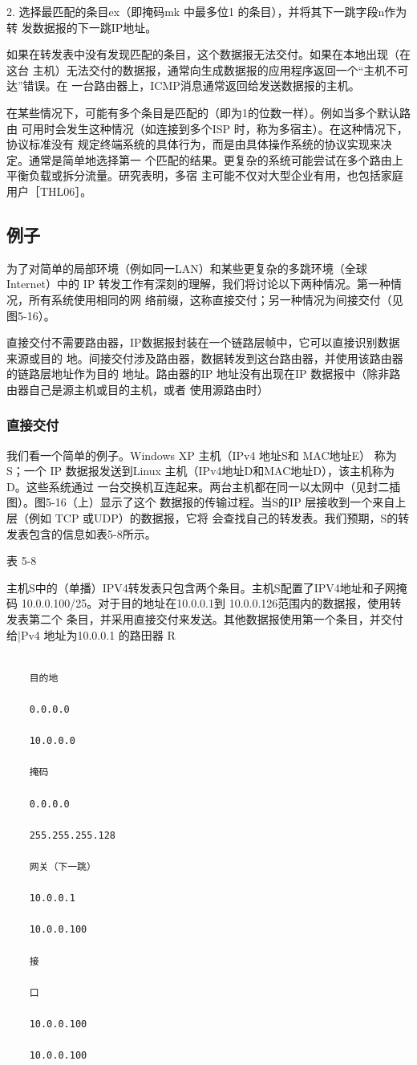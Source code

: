 2. 选择最匹配的条目ex（即掩码mk 中最多位1 的条目），并将其下一跳字段n作为转
发数据报的下一跳IP地址。

如果在转发表中没有发现匹配的条目，这个数据报无法交付。如果在本地出现（在这台
主机）无法交付的数据报，通常向生成数据报的应用程序返回一个“主机不可达”错误。在
一台路由器上，ICMP消息通常返回给发送数据报的主机。

在某些情况下，可能有多个条目是匹配的（即为1的位数一样）。例如当多个默认路由
可用时会发生这种情况（如连接到多个ISP 时，称为多宿主）。在这种情况下，协议标准没有
规定终端系统的具体行为，而是由具体操作系统的协议实现来决定。通常是简单地选择第一
个匹配的结果。更复杂的系统可能尝试在多个路由上平衡负载或拆分流量。研究表明，多宿
主可能不仅对大型企业有用，也包括家庭用户［THL06］。

\subsection{例子}

为了对简单的局部环境（例如同一LAN）和某些更复杂的多跳环境（全球 Internet）中的
IP 转发工作有深刻的理解，我们将讨论以下两种情况。第一种情况，所有系统使用相同的网
络前缀，这称直接交付；另一种情况为间接交付（见图5-16）。

直接交付不需要路由器，IP数据报封装在一个链路层帧中，它可以直接识别数据来源或目的
地。间接交付涉及路由器，数据转发到这台路由器，并使用该路由器的链路层地址作为目的
地址。路由器的IP 地址没有出现在IP 数据报中（除非路由器自己是源主机或目的主机，或者
使用源路由时）

\subsubsection{直接交付}
我们看一个简单的例子。Windows XP 主机（IPv4 地址S和 MAC地址E） 称为S；一个
IP 数据报发送到Linux 主机（IPv4地址D和MAC地址D），该主机称为D。这些系统通过
一台交换机互连起来。两台主机都在同一以太网中（见封二插图）。图5-16（上）显示了这个
数据报的传输过程。当S的IP 层接收到一个来自上层（例如 TCP 或UDP）的数据报，它将
会查找自己的转发表。我们预期，S的转发表包含的信息如表5-8所示。

表 5-8

主机S中的（单播）IPV4转发表只包含两个条目。主机S配置了IPV4地址和子网掩码
10.0.0.100/25。对于目的地址在10.0.0.1到 10.0.0.126范围内的数据报，使用转发表第二个
条目，并采用直接交付来发送。其他数据报使用第一个条目，并交付给|Pv4 地址为10.0.0.1
的路田器 R
\begin{verbatim}

    目的地

    0.0.0.0

    10.0.0.0

    掩码

    0.0.0.0

    255.255.255.128

    网关（下一跳）

    10.0.0.1

    10.0.0.100

    接

    口

    10.0.0.100

    10.0.0.100
\end{verbatim}

